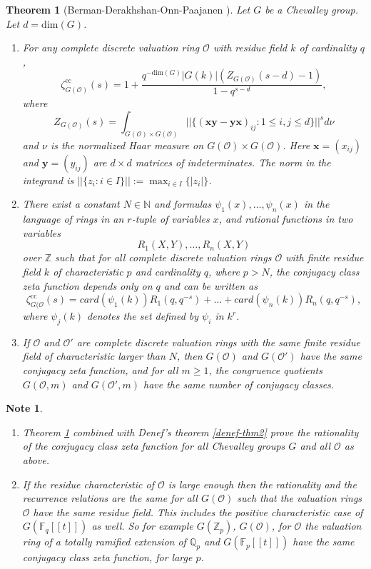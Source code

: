 \documentclass[12pt]{amsart}
\def\F{\mathbb{F}}
\def\cc{\mathrm{cc}}
\def\Z{\mathbb{Z}}
\def \suchthat {\ensuremath{:}}
\def\Q{\mathbb{Q}}
\def\F{\mathbb{F}}
\def\cO{\mathcal{O}}
\newtheorem{thm}{Theorem}[section]
\numberwithin{equation}{section}
\newtheorem{note}{Note}[section]
\begin{document}
\begin{thm} [Berman-Derakhshan-Onn-Paajanen \cite{BDOP}]\label{BDOP} Let $G$ be a Chevalley group. Let $d=\mathrm{dim}(G)$. 
\begin{enumerate}
\item For any complete discrete valuation ring $\cO$ with residue field $k$ of cardinality $q$,
$$\zeta_{G(\cO)}^{\cc}(s)=1+\frac{q^{-\mathrm{dim}(G)}|G(k)|(Z_{G(\cO)}(s-d)-1)}{1-q^{s-d}},$$
where $$Z_{G(\cO)}(s)=\int_{G(\cO)\times G(\cO)}
||\{(\mathbf{xy-yx})_{ij}\suchthat  1\leq i,j\leq d\} ||^sd\nu$$
and $\nu$ is the normalized Haar measure on $G(\cO)\times G(\cO)$. Here
$\mathbf{x}=(x_{ij})$ and $\mathbf{y}=(y_{ij})$ are $d\times d$
matrices of indeterminates. The norm in the integrand is $||\{z_i:
i\in I\}||:=\max_{i\in I}\{|z_i| \}$.
\item There exist a constant $N\in \mathbb{N}$ and formulas 
$\psi_1(x),\dots,\psi_n(x)$ in the language of rings in an $r$-tuple of variables $x$, and rational
functions in two variables 
$$R_1(X,Y),\dots,R_n(X,Y)$$ over $\Z$ such that for all
complete discrete valuation rings $\cO$ with finite residue field
$k$ of characteristic $p$ and cardinality $q$, where
$p>N$, the conjugacy class zeta function depends only on $q$ and
can be written as
$$\zeta^{\cc}_{G(\cO}(s)=card(\psi_1(k))R_1(q,q^{-s})+\dots+card(\psi_n(k)) R_n(q,q^{-s}),$$
where $\psi_j(k)$ denotes the set defined by $\psi_i$ in $k^r$. 
\item If $\cO$ and $\cO'$ are complete discrete valuation rings with the same finite
residue field of characteristic larger than $N$, then $G(\cO)$
and $G(\cO')$ have the same conjugacy zeta function, and for all $m\geq 1$, the congruence quotients $G(\cO,m)$ and $G(\cO',m)$ have the same number of conjugacy classes.
\end{enumerate}
\end{thm}



\begin{note} \noindent
\begin{enumerate}
\item Theorem \ref{BDOP} combined with Denef's theorem \ref{denef-thm2} prove the rationality of the conjugacy class zeta function for all Chevalley groups $G$ and all $\cO$ as above.  
\item If the residue characteristic of $\cO$ is large enough then the rationality and the recurrence relations are the same for all $G(\cO)$ such that the valuation rings $\cO$ have the same residue field. This includes the positive characteristic case of $G(\F_q[[t]])$ as well. So for example $G(\Z_p)$, $G(\cO)$, for $\cO$ the valuation ring of a totally ramified extension of $\Q_p$ and $G(\F_p[[t]])$ have the same conjugacy class zeta function, for large $p$.\end{enumerate}\end{note}
\end{document}
